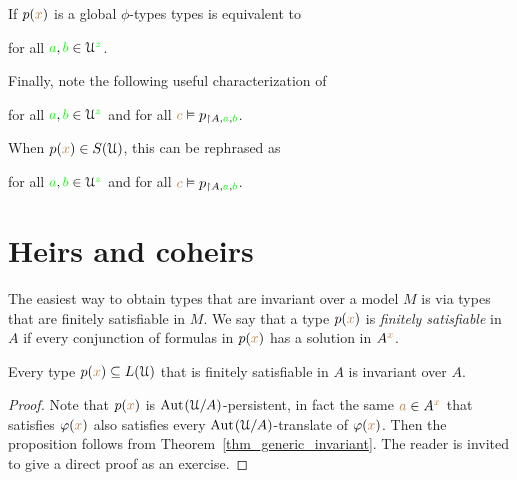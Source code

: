 
If $p({\color{brown} x})$ is a global $\phi$-types types  is equivalent to

\hfill for all ${\color{green} a},{\color{green} b}\in\EuScript U^{\color{green} z}$.

Finally, note the following useful characterization of 

\hfill for all ${\color{green} a},{\color{green} b}\in\EuScript U^{\color{green} z}$ and for all ${\color{brown} c}\vDash p_{\restriction A,{\color{green} a},{\color{green} b}}$.

When $p({\color{brown} x})\in S(\EuScript U)$, this can be rephrased as

\hfill for all ${\color{green} a},{\color{green} b}\in\EuScript U^{\color{green} z}$ and for all ${\color{brown} c}\vDash p_{\restriction A,{\color{green} a},{\color{green} b}}$.

\section{Heirs and coheirs}
\label{coheirs}

\def\medrel#1{\parbox[t]{6ex}{$\displaystyle\hfil #1$}}
\def\ceq#1#2#3{\parbox[t]{16ex}{$\displaystyle #1$}\medrel{#2}{$\displaystyle #3$}}

The easiest way to obtain types that are invariant over a model $M$ is via types that are finitely satisfiable in $M$.
We say that a type $p({\color{brown} x})$ is \emph{finitely satisfiable\/} in $A$ if every conjunction of formulas in $p({\color{brown} x})$ has a solution in $A^{\color{brown} x}$.

\begin{proposition}\label{prop_coeredi_quasiinvarienti}
  Every type $p({\color{brown} x})\subseteq L(\EuScript U)$ that is finitely satisfiable in $A$ is invariant over $A$.
\end{proposition}

\begin{proof}
  Note that $p({\color{brown} x})$ is ${\rm Aut\kern.15ex}(\EuScript U/A)$-persistent, in fact the same ${\color{brown} a}\in A^{\color{brown} x}$ that satisfies $\varphi({\color{brown} x})$ also satisfies every ${\rm Aut\kern.15ex}(\EuScript U/A)$-translate of $\varphi({\color{brown} x})$.
  Then the proposition follows from Theorem~\ref{thm_generic_invariant}. 
    The reader is invited to give a direct proof as an exercise.
\end{proof}

